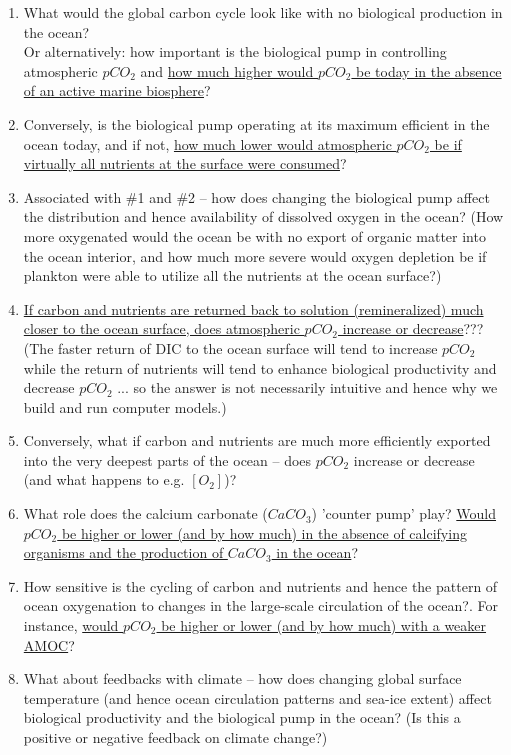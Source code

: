 \begin{enumerate}[noitemsep]
\vspace{1mm}
\item What would the global carbon cycle look like with no biological production in the ocean? \\Or alternatively: how important is the biological pump in controlling atmospheric \(pCO_{2}\) and \uline{how much higher would \(pCO_{2}\) be today in the absence of an active marine biosphere}?
\vspace{1mm}
\item Conversely, is the biological pump operating at its maximum efficient in the ocean today, and if not, \uline{how much lower would atmospheric \(pCO_{2}\) be if virtually all nutrients at the surface were consumed}?
\vspace{1mm}
\item Associated with \#1 and \#2 -- how does changing the biological pump affect the distribution and hence availability of dissolved oxygen in the ocean? (How more oxygenated would the ocean be with no export of organic matter into the ocean interior, and how much more severe would oxygen depletion be if plankton were able to utilize all the nutrients at the ocean surface?)
\vspace{1mm}
\item \uline{If carbon and nutrients are returned back to solution (remineralized) much closer to the ocean surface, does atmospheric \(pCO_{2}\) increase or decrease}??? (The faster return of DIC to the ocean surface will tend to increase \(pCO_{2}\) while the return of nutrients will tend to enhance biological productivity and decrease \(pCO_{2}\) ... so the answer is not necessarily intuitive and hence why we build and run computer models.)
\vspace{1mm}
\item Conversely, what if carbon and nutrients are much more efficiently exported into the very deepest parts of the ocean -- does \(pCO_{2}\) increase or decrease (and what happens to e.g. \([O_{2}]\))?
\vspace{1mm}
\item What role does the calcium carbonate (\(CaCO_{3}\)) 'counter pump' play? \uline{Would \(pCO_{2}\) be higher or lower (and by how much) in the absence of calcifying organisms and the production of \(CaCO_{3}\) in the ocean}?
\vspace{1mm}
\item How sensitive is the cycling of carbon and nutrients and hence the pattern of ocean oxygenation to changes in the large-scale circulation of the ocean?. For instance, \uline{would \(pCO_{2}\) be higher or lower (and by how much) with a weaker AMOC}?
\vspace{1mm}
\item What about feedbacks with climate -- how does changing global surface temperature (and hence ocean circulation patterns and sea-ice extent) affect biological productivity and the biological pump in the ocean? (Is this a positive or negative feedback on climate change?)
\end{enumerate}
\vspace{1mm}

